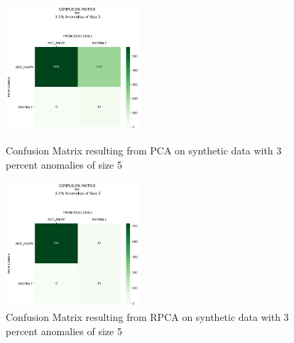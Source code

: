 \documentclass[conference]{IEEEtran}
\begin{document}
\begin{figure}[H]
\begin{minipage}[b]{0.45\linewidth}
    \centering

    \includegraphics[width=50mm, scale=0.5]{cmPCATest_120AnomSize5.jpg}
    \caption{Confusion Matrix resulting from PCA on synthetic data with 3 percent anomalies of size 5}
    \label{fig::CMtrainPCA1205}
\end{minipage}
\quad
\begin{minipage}[b]{0.45\linewidth}
    \centering
    \includegraphics[width=50mm, scale=0.5]{cmRPCATest_120AnomSize5.jpg}
    \caption{Confusion Matrix resulting from RPCA on synthetic data with 3 percent anomalies of size 5}
    \label{fig::CMtrainRPCA125}
\end{minipage}
\end{figure}

\end{document}
